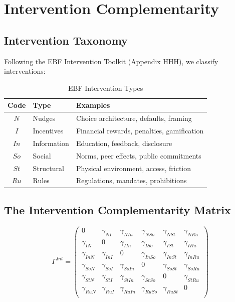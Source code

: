 \section{Intervention Complementarity}
\label{sec:intervention}

\subsection{Intervention Taxonomy}

Following the EBF Intervention Toolkit (Appendix HHH), we classify interventions:

\begin{table}[h]
\centering
\caption{EBF Intervention Types}
\label{tab:intervention-types}
\renewcommand{\arraystretch}{1.3}
\begin{tabular}{@{}clp{5.5cm}@{}}
\toprule
\textbf{Code} & \textbf{Type} & \textbf{Examples} \\
\midrule
$N$ & Nudges & Choice architecture, defaults, framing \\
$I$ & Incentives & Financial rewards, penalties, gamification \\
$In$ & Information & Education, feedback, disclosure \\
$So$ & Social & Norms, peer effects, public commitments \\
$St$ & Structural & Physical environment, access, friction \\
$Ru$ & Rules & Regulations, mandates, prohibitions \\
\bottomrule
\end{tabular}
\end{table}

\subsection{The Intervention Complementarity Matrix}

\begin{definition}
\begin{equation}
\Gamma^{Int} = \begin{pmatrix}
0 & \gamma_{NI} & \gamma_{NIn} & \gamma_{NSo} & \gamma_{NSt} & \gamma_{NRu} \\
\gamma_{IN} & 0 & \gamma_{IIn} & \gamma_{ISo} & \gamma_{ISt} & \gamma_{IRu} \\
\gamma_{InN} & \gamma_{InI} & 0 & \gamma_{InSo} & \gamma_{InSt} & \gamma_{InRu} \\
\gamma_{SoN} & \gamma_{SoI} & \gamma_{SoIn} & 0 & \gamma_{SoSt} & \gamma_{SoRu} \\
\gamma_{StN} & \gamma_{StI} & \gamma_{StIn} & \gamma_{StSo} & 0 & \gamma_{StRu} \\
\gamma_{RuN} & \gamma_{RuI} & \gamma_{RuIn} & \gamma_{RuSo} & \gamma_{RuSt} & 0 \\
\end{pmatrix}
\end{equation}
\end{definition}

